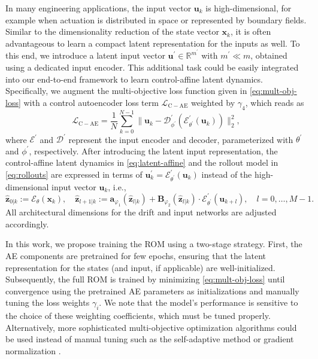 \documentclass{article}
\begin{document}
In many engineering applications, the input vector $\mathbf{u}_k$ is high-dimensional, for example when actuation is distributed in space or represented by boundary fields.
Similar to the dimensionality reduction of the state vector $\mathbf{x}_k$, it is often advantageous to learn a compact latent representation for the inputs as well.
To this end, we introduce a latent input vector $\mathbf{u}^\prime \in \mathbb{R}^{m^\prime}$ with $m^\prime \ll m$, obtained using a dedicated input encoder.
This additional task could be easily integrated into our end-to-end framework to learn control-affine latent dynamics.
Specifically, we augment the multi-objective loss function given in \eqref{eq:mult-obj-loss} with a control autoencoder loss term $\mathcal{L}_{\mathrm{C-AE}}$ weighted by $\gamma_4$, which reads as
\begin{equation}
    \label{eq:control-AE}
    \mathcal{L}_{\mathrm{C-AE}} = \frac{1}{N} \sum_{k=0}^{N-1} \| \mathbf{u}_k - \mathcal{D}^\prime_{\phi^\prime}(\mathcal{E}^\prime_{\theta^\prime}(\mathbf{u}_k)) \|_2^2,
\end{equation}
where $\mathcal{E}^\prime$ and $\mathcal{D}^\prime$ represent the input encoder and decoder, parameterized with $\theta^\prime$ and $\phi^\prime$, respectively.
After introducing the latent input representation, the control-affine latent dynamics in \eqref{eq:latent-affine} and the rollout model in \eqref{eq:rollouts} are expressed in terms of $\mathbf{u}^\prime_k=\mathcal{E}^\prime_{\theta^\prime}(\mathbf{u}_k)$ instead of the high-dimensional input vector $\mathbf{u}_k$, i.e.,
\begin{equation}
\label{eq:rollouts-with-input-encoder}
\hat{\mathbf{z}}_{0|k} := \mathcal{E}_\theta(\mathbf{x}_k), \quad
\hat{\mathbf{z}}_{l+1|k} := \mathbf{a}_{\varphi_1}(\hat{\mathbf{z}}_{l|k}) + \mathbf{B}_{\varphi_2}(\hat{\mathbf{z}}_{l|k})\cdot \mathcal{E}^\prime_{\theta^\prime}(\mathbf{u}_{k+l}), \quad l = 0,\dots,M-1.
\end{equation}
All architectural dimensions for the drift and input networks are adjusted accordingly.

In this work, we propose training the ROM using a two-stage strategy.
First, the AE components are pretrained for few epochs, ensuring that the latent representation for the states (and input, if applicable) are well-initialized.
Subsequently, the full ROM is trained by minimizing \eqref{eq:mult-obj-loss} until convergence using the pretrained AE parameters as initializations and manually tuning the loss weights $\gamma_i$.
We note that the model's performance is sensitive to the choice of these weighting coefficients, which must be tuned properly.
Alternatively, more sophisticated multi-objective optimization algorithms could be used instead of manual tuning such as the self-adaptive method \citep{mcclenny2023self} or gradient normalization \citep{chen2018gradnorm}.
\end{document}
